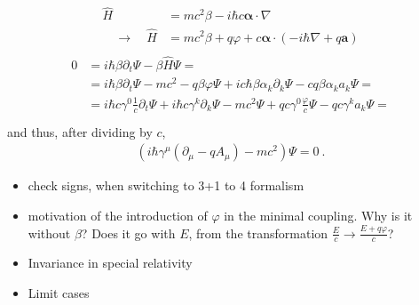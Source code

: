 \documentclass[letterpaper,10pt,english]{jupyterBook}
\begin{document}
\begin{equation*}
\begin{split}\begin{aligned}
  \hat{H} & = m c^2 \beta - i \hbar c \boldsymbol\alpha \cdot \nabla \\
\quad \rightarrow \quad \hat{H} & = m c^2 \beta + q \varphi + c \boldsymbol\alpha \cdot \left( - i \hbar \nabla + q\mathbf{a} \right)
\end{aligned}\end{split}
\end{equation*}\begin{equation*}
\begin{split}\begin{aligned}
  0
  & = i \hbar \beta \partial_t \Psi - \beta \hat{H} \Psi = \\
  & = i \hbar \beta \partial_t \Psi - m c^2 - q \beta \varphi \Psi + i c \hbar \beta \alpha_k \partial_k \Psi - c q \beta \alpha_k a_k \Psi = \\
  & = i \hbar c \gamma^0 \frac{1}{c}\partial_t \Psi + i \hbar c \gamma^k \partial_k \Psi - m c^2 \Psi + q c \gamma^0 \frac{\varphi}{c} \Psi - q c \gamma^k a_k \Psi = \\
\end{aligned}\end{split}
\end{equation*}
\sphinxAtStartPar
and thus, after dividing by \(c\),
\begin{equation*}
\begin{split}\left( i \hbar \gamma^\mu \left( \partial_{\mu} - q A_\mu \right) - m c^2 \right) \Psi = 0 \ .\end{split}
\end{equation*}
\sphinxAtStartPar
{}
\begin{itemize}
\item {} 
\sphinxAtStartPar
check signs, when switching to 3+1 to 4 formalism

\item {} 
\sphinxAtStartPar
motivation of the introduction of \(\varphi\) in the minimal coupling. Why is it without \(\beta\)? Does it go with \(E\), from the transformation \(\frac{E}{c} \rightarrow \frac{E + q \varphi}{c}\)?

\item {} 
\sphinxAtStartPar
Invariance in special relativity

\item {} 
\sphinxAtStartPar
Limit cases

\end{itemize}
\end{document}
